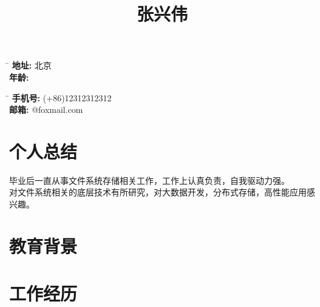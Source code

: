\documentclass[10pt]{article} %
\begin{document}
\title{张兴伟}
\parbox{2pt}{
\begin{tabbing}
\hspace{1.5cm} \= \hspace{4cm} \kill %
\textbf{地址:} \>北京\\
\textbf{年龄:} 
\end{tabbing}
}
\hfill %
\parbox{2pt}{
\begin{tabbing}
\hspace{1.5cm} \= \hspace{4cm} \kill %
\textbf{手机号:} \>(+86)12312312312\\ 
\textbf{邮箱:} @foxmail.com
\end{tabbing}
}

\section{个人总结}
毕业后一直从事文件系统存储相关工作，工作上认真负责，自我驱动力强。\\对文件系统相关的底层技术有所研究，对大数据开发，分布式存储，高性能应用感兴趣。
\section{教育背景}
\section{工作经历}
\end{document}
